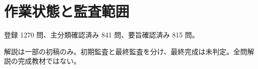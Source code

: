\chapter{作業状態と監査範囲}
登録 1270 問、主分類確認済み 841 問、要旨確認済み 815 問。
\par 解説は一部の初稿のみ。初期監査と最終監査を分け、最終完成は未判定。全問解説の完成教材ではない。
